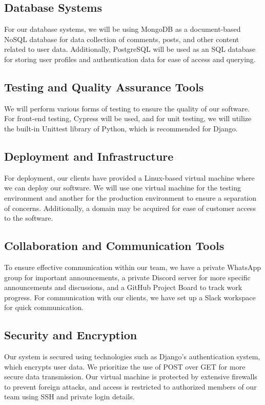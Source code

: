 \documentclass[12pt]{article}
\begin{document}
\subsection{Database Systems}
For our database systems, we will be using MongoDB as a document-based NoSQL database for data collection of comments, posts, and other content related to user data. Additionally, PostgreSQL will be used as an SQL database for storing user profiles and authentication data for ease of access and querying.

\subsection{Testing and Quality Assurance Tools}
We will perform various forms of testing to ensure the quality of our software. For front-end testing, Cypress will be used, and for unit testing, we will utilize the built-in Unittest library of Python, which is recommended for Django.

\subsection{Deployment and Infrastructure}
For deployment, our clients have provided a Linux-based virtual machine where we can deploy our software. We will use one virtual machine for the testing environment and another for the production environment to ensure a separation of concerns. Additionally, a domain may be acquired for ease of customer access to the software.

\subsection{Collaboration and Communication Tools}
To ensure effective communication within our team, we have a private WhatsApp group for important announcements, a private Discord server for more specific announcements and discussions, and a GitHub Project Board to track work progress. For communication with our clients, we have set up a Slack workspace for quick communication.

\subsection{Security and Encryption}
Our system is secured using technologies such as Django's authentication system, which encrypts user data. We prioritize the use of POST over GET for more secure data transmission. Our virtual machine is protected by extensive firewalls to prevent foreign attacks, and access is restricted to authorized members of our team using SSH and private login details.
\end{document}
